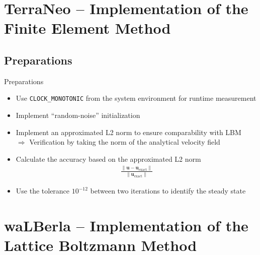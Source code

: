 \documentclass[aspectratio=43,t]{beamer}
\begin{document}
\section{TerraNeo -- Implementation of the Finite Element Method}

\subsection{Preparations}
\begin{frame}{Preparations}
\begin{itemize}
	\item Use  \texttt{CLOCK\_MONOTONIC} from the system environment for runtime measurement
	\item Implement \enquote{random-noise} initialization 
	\item Implement an approximated L2 norm to ensure comparability with LBM\\
		$\Rightarrow$ Verification by taking the norm of the analytical velocity field 
	\item Calculate the accuracy based on the approximated L2 norm
		\begin{align*}
			\frac{\lVert \bm{u}-\bm{u}_{\text{exact}} \rVert}{\lVert \bm{u}_{\text{exact}} \rVert}
		\end{align*}
	\item Use the tolerance $10^{-12}$ between two iterations to identify the steady state
\end{itemize}
\end{frame}

\section{waLBerla -- Implementation of the Lattice Boltzmann Method}
\end{document}
